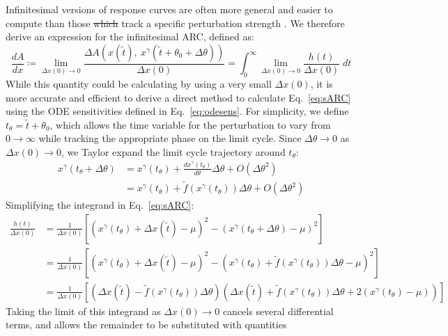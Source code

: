 \documentclass[11pt, letterpaper]{article}
\providecommand{\DIFadd}[1]{{\protect\color{blue}\uwave{#1}}} %
\providecommand{\DIFdel}[1]{{\protect\color{red}\sout{#1}}}                      %
\providecommand{\DIFaddbegin}{} %
\providecommand{\DIFaddend}{} %
\providecommand{\DIFdelbegin}{} %
\providecommand{\DIFdelend}{} %
\begin{document}
Infinitesimal versions of response curves are often more general and easier to
compute than those \DIFdelbegin \DIFdel{which }\DIFdelend \DIFaddbegin \DIFadd{that }\DIFaddend track a specific perturbation strength \cite{Rand2004}.
We therefore derive an expression for the infinitesimal ARC, defined as:
\begin{equation}
  \frac{dA}{dx} \coloneqq \lim_{\Delta x(0) \to 0} \frac{\Delta
    A\left(x(\tilde{t}),\ x^\gamma(\tilde{t} + \theta_0 +
  \Delta\theta)\right)}{\Delta x(0)} = \int_0^\infty \lim_{\Delta x(0) \to 0}
  \frac{h(t)}{\Delta x(0)} \; dt
  \label{eq:sARC}
\end{equation}
While this quantity could be calculating by using a very small $\Delta x(0)$, it
is more accurate and efficient to derive a direct method to calculate
Eq.~\ref{eq:sARC} using the ODE sensitivities defined in Eq.~\ref{eq:odesens}.
For simplicity, we define $t_\theta = \tilde{t} + \theta_0$, which allows the
time variable for the perturbation to vary from $0 \to \infty$ while tracking
the appropriate phase on the limit cycle. Since $\Delta \theta \to 0$ as $\Delta
x(0) \to 0$, we Taylor expand the limit cycle trajectory around $t_\theta$:
\begin{align}
  x^\gamma(t_\theta + \Delta\theta) &= x^\gamma(t_\theta) +
  \frac{dx^\gamma(t_\theta)}{d\theta}\Delta\theta + O(\Delta\theta^2)\\
  &= x^\gamma(t_\theta) + \tilde{f}\left(x^\gamma(t_\theta)\right)\Delta\theta +
  O(\Delta\theta^2)
\end{align}
Simplifying the integrand in Eq.~\ref{eq:sARC}:
\begin{align}
  \frac{h(t)}{\Delta x(0)} &= \frac{1}{\Delta x(0)} \left[\left(x^\gamma(t_\theta) +
    \Delta x(\tilde{t}) - \mu\right)^2 - \left(x^\gamma(t_\theta +
    \Delta \theta) - \mu\right)^2 \right]\\
  &= \frac{1}{\Delta x(0)} \left[\left(x^\gamma(t_\theta) +
    \Delta x(\tilde{t}) - \mu\right)^2 - \left(x^\gamma(t_\theta) + \tilde{f}\left(x^\gamma(t_\theta)\right)\Delta\theta - \mu\right)^2 \right]\\
  &= \frac{1}{\Delta x(0)} \left[\left(\Delta x(\tilde{t}) -
    \tilde{f}\left(x^\gamma(t_\theta)\right)\Delta\theta\right) \left(\Delta
    x(\tilde{t}) + \tilde{f}\left(x^\gamma(t_\theta)\right)\Delta\theta +
    2(x^\gamma(t_\theta) - \mu)\right) \right]
\end{align}
Taking the limit of this integrand as $\Delta x(0) \to 0$ cancels several
differential terms, and allows the remainder to be substituted with quantities
\end{document}
